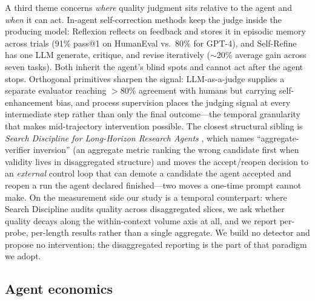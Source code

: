 \documentclass[11pt]{article}
\begin{document}
A third theme concerns \emph{where} quality judgment sits relative to the
agent and \emph{when} it can act. In-agent self-correction methods keep the
judge inside the producing model: Reflexion \cite{shinn2023reflexion} reflects
on feedback and stores it in episodic memory across trials (91\% pass@1 on
HumanEval vs.\ 80\% for GPT-4), and Self-Refine \cite{madaan2023selfrefine}
has one LLM generate, critique, and revise iteratively ($\sim$20\% average
gain across seven tasks). Both inherit the agent's blind spots and cannot act
after the agent stops. Orthogonal primitives sharpen the signal:
LLM-as-a-judge \cite{zheng2023judge} supplies a separate evaluator reaching
$>$80\% agreement with humans but carrying self-enhancement bias, and process
supervision \cite{lightman2023verify} places the judging signal at every
intermediate step rather than only the final outcome---the temporal
granularity that makes mid-trajectory intervention possible. The closest
structural sibling is \emph{Search Discipline for Long-Horizon Research Agents}
\cite{srinivasan2026searchdiscipline}, which names ``aggregate-verifier
inversion'' (an aggregate metric ranking the wrong candidate first when
validity lives in disaggregated structure) and moves the accept/reopen
decision to an \emph{external} control loop that can demote a candidate the
agent accepted and reopen a run the agent declared finished---two moves a
one-time prompt cannot make. On the measurement side our study is a temporal counterpart: where Search Discipline audits quality across disaggregated slices, we ask whether quality decays along the within-context volume axis at all, and we report per-probe, per-length results rather than a single aggregate. We build no detector and propose no intervention; the disaggregated reporting is the part of that paradigm we adopt.

\subsection{Agent economics}
\label{sec:rw-economics}
\end{document}
